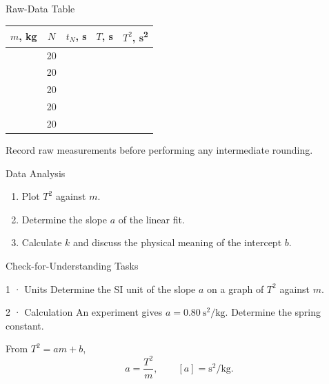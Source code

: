 \begin{frame}{Raw-Data Table}
  \centering
  \renewcommand{\arraystretch}{1.22}
  \begin{tabular}{@{}ccccc@{}}
    \toprule
    $m$, \si{\kilo\gram} & $N$ & $t_N$, \si{\second} & $T$, \si{\second} & $T^2$, \si{\second\squared} \\
    \midrule
    \phantom{0.000} & 20 & \phantom{00.00} & \phantom{0.000} & \phantom{0.000} \\
    & 20 & & & \\
    & 20 & & & \\
    & 20 & & & \\
    & 20 & & & \\
    \bottomrule
  \end{tabular}

  \vspace{0.9em}
  {\color{PhysicsMuted}\small Record raw measurements before performing any intermediate rounding.}
\end{frame}

\begin{frame}{Data Analysis}
  \vspace{0.8em}
  \begin{enumerate}
    \item Plot $T^2$ against $m$.
    \item Determine the slope $a$ of the linear fit.
    \item Calculate $k$ and discuss the physical meaning of the intercept $b$.
  \end{enumerate}
\end{frame}

\begin{frame}{Check-for-Understanding Tasks}
  \vspace{0.6em}
  \begin{block}{1 · Units}
    Determine the SI unit of the slope $a$ on a graph of $T^2$ against $m$.
  \end{block}
  \begin{block}{2 · Calculation}
    An experiment gives $a=\SI{0.80}{\second\squared\per\kilo\gram}$.
    Determine the spring constant.
  \end{block}
\end{frame}

\begin{solutionframe}
  From $T^2=am+b$,
  \[
    a=\frac{T^2}{m},
    \qquad
    [a]=\si{\second\squared\per\kilo\gram}.
  \]
\end{solutionframe}

